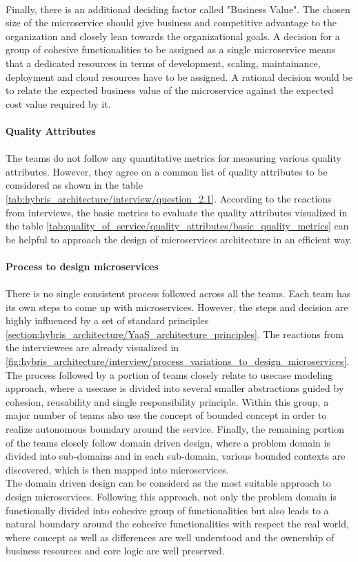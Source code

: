 \\
Finally, there is an additional deciding factor called "Business Value". The chosen size of the microservice should give business and competitive advantage to the organization and closely lean towards the organizational goals. A decision for a group of cohesive functionalities to be assigned as a single microservice means that a dedicated resources in terms of development, scaling, maintainance, deployment and cloud resources have to be assigned. A rational decision would be to relate the expected business value of the microservice against the expected cost value required by it.
\\
\\
\textbf{Quality Attributes}
\\
\\
The teams do not follow any quantitative metrics for measuring various quality attributes. However, they agree on a common list of quality attributes to be considered as shown in the table \ref{tab:hybris_architecture/interview/question_2.1}. According to the reactions from interviews, the basic metrics to evaluate the quality attributes visualized in the table  \ref{tab:quality_of_service/quality_attributes/basic_quality_metrics} can be helpful to approach the design of microservices architecture in an efficient way.
\\
\\
\textbf{Process to design microservices}
\\
\\
There is no single consistent process followed across all the teams. Each team has its own steps to come up with microservices. However, the steps and decision are highly influenced by a set of  standard principles \ref{section:hybris_architecture/YaaS_architecture_principles}. The reactions from the interviewees are already visualized in \ref{fig:hybris_architecture/interview/process_variations_to_design_microservices}. 
\\
The process followed by a portion of teams closely relate to usecase modeling approach, where a usecase is divided into several smaller abstractions guided by cohesion, reusability and single responsibility principle. Within this group, a major number of teams also use the concept of bounded concept in order to realize autonomous boundary around the service. Finally, the remaining portion of the teams closely follow domain driven design, where a problem domain is divided into sub-domains and in each sub-domain, various bounded contexts are discovered, which is then mapped into microservices. 
\\
The domain driven design can be considerd as the most suitable approach to design microservices. Following this approach, not only the problem domain is functionally divided into cohesive group of functionalities but also leads to a natural boundary around the cohesive functionalities with respect the real world, where concept as well as differences are well understood and the ownership of business resources and core logic are well preserved.

